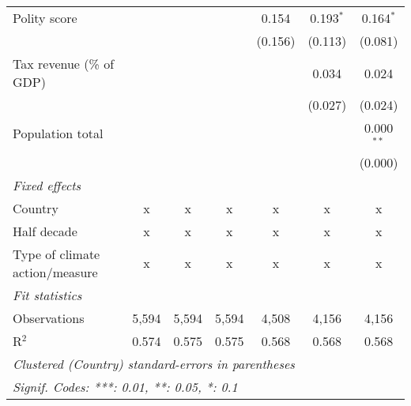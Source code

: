 \begin{tabular}{lcccccc}
   Polity score                                              &              &               &                & 0.154          & 0.193$^{*}$    & 0.164$^{*}$\\   
                                                             &              &               &                & (0.156)        & (0.113)        & (0.081)\\   
   Tax revenue (\% of GDP)                                   &              &               &                &                & 0.034          & 0.024\\   
                                                             &              &               &                &                & (0.027)        & (0.024)\\   
   Population total                                          &              &               &                &                &                & 0.000$^{**}$\\   
                                                             &              &               &                &                &                & (0.000)\\   
   \emph{Fixed effects}\\
   Country                                                   & x            & x             & x              & x              & x              & x\\  
   Half decade                                               & x            & x             & x              & x              & x              & x\\  
   Type of climate action/measure                            & x            & x             & x              & x              & x              & x\\  
   \midrule \emph{Fit statistics}\\
   Observations                                              & 5,594        & 5,594         & 5,594          & 4,508          & 4,156          & 4,156\\  
   R$^2$                                                     & 0.574        & 0.575         & 0.575          & 0.568          & 0.568          & 0.568\\  
   \midrule
   \multicolumn{7}{l}{\emph{Clustered (Country) standard-errors in parentheses}}\\
   \multicolumn{7}{l}{\emph{Signif. Codes: ***: 0.01, **: 0.05, *: 0.1}}\\
\end{tabular}
\par\endgroup


